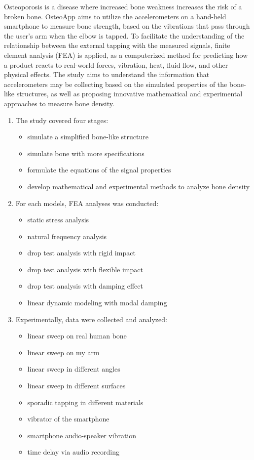 \documentclass{sigchi}
\begin{document}
Osteoporosis is a disease where increased bone weakness increases the risk of a broken bone. OsteoApp aims to utilize the accelerometers on a hand-held smartphone to measure bone strength, based on the vibrations that pass through the user's arm when the elbow is tapped. To facilitate the understanding of the relationship between the external tapping with the measured signals, finite element analysis (FEA) is applied, as a computerized method for predicting how a product reacts to real-world forces, vibration, heat, fluid flow, and other physical effects. The study aims to understand the information that accelerometers may be collecting based on the simulated properties of the bone-like structures, as well as proposing innovative mathematical and experimental approaches to measure bone density. 

\begin{enumerate}
   \item The study covered four stages:
	\begin{itemize}
	\item simulate a simplified bone-like structure
	\item simulate bone with more specifications
	\item formulate the equations of the signal properties
	\item develop mathematical and experimental methods to analyze bone density
	\end{itemize}

	\item For each models, FEA analyses was conducted:
	\begin{itemize}
	\item static stress analysis
	\item natural frequency analysis
	\item drop test analysis with rigid impact
	\item drop test analysis with flexible impact
	\item drop test analysis with damping effect
	\item linear dynamic modeling with modal damping 
	\end{itemize}

	\item Experimentally, data were collected and analyzed:
	\begin{itemize}
	\item linear sweep on real human bone
	\item linear sweep on my arm 
	\item linear sweep in different angles
	\item linear sweep in different surfaces
	\item sporadic tapping in different materials
	\item vibrator of the smartphone
	\item smartphone audio-speaker vibration
	\item time delay via audio recording
	\end{itemize}
\end{enumerate}
\end{document}
